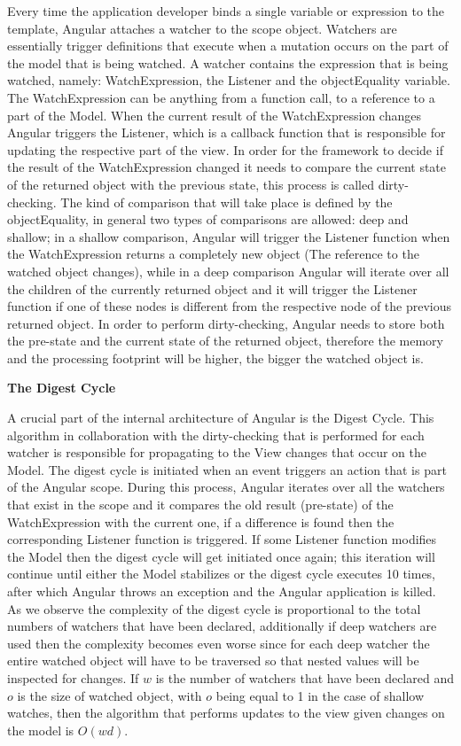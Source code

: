 {Every time the application developer binds a single variable or expression to the template, Angular attaches a watcher to the scope object. Watchers are essentially trigger definitions that execute when a mutation occurs on the part of the model that is being watched. A watcher contains the expression that is being watched, namely: WatchExpression, the Listener and the objectEquality variable. The WatchExpression can be anything from a function call, to a reference to a part of the Model. When the current result of the WatchExpression changes Angular triggers the Listener, which is a callback function that is responsible for updating the respective part of the view. In order for the framework to decide if the result of the WatchExpression changed it needs to compare the current state of the returned object with the previous state, this process is called dirty-checking. The kind of comparison that will take place is defined by the objectEquality, in general two types of comparisons are allowed: deep and shallow; in a shallow comparison, Angular will trigger the Listener function when the WatchExpression returns a completely new object (The reference to the watched object changes), while in a deep comparison Angular will iterate over all the children of the currently returned object and it will trigger the Listener function if one of these nodes is different from the respective node of the previous returned object. In order to perform dirty-checking, Angular needs to store both the pre-state and the current state of the returned object, therefore the memory and the processing footprint will be higher, the bigger the watched object is.

\textbf{The Digest Cycle}

A crucial part of the internal architecture of Angular is the Digest Cycle. This algorithm in collaboration with the dirty-checking that is performed for each watcher is responsible for propagating to the View changes that occur on the Model. The digest cycle is initiated when an event triggers an action that is part of the Angular scope. During this process, Angular iterates over all the watchers that exist in the scope and it compares the old result (pre-state) of the WatchExpression with the current one, if a difference is found then the corresponding Listener function is triggered. If some Listener function modifies the Model then the digest cycle will get initiated once again; this iteration will continue until either the Model stabilizes or the digest cycle executes 10 times, after which Angular throws an exception and the Angular application is killed. As we observe the complexity of the digest cycle is proportional to the total numbers of watchers that have been declared, additionally if deep watchers are used then the complexity becomes even worse since for each deep watcher the entire watched object will have to be traversed so that nested values will be inspected for changes. If $w$ is the number of watchers that have been declared and $o$ is the size of watched object, with $o$ being equal to 1 in the case of shallow watches, then the algorithm that performs updates to the view given changes on the model is $O(wd)$.

}
